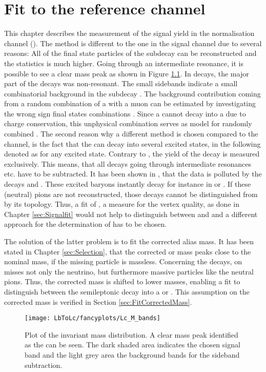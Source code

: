 \chapter{Fit to the reference channel \LbToLcmunu}
\label{sec:Normalisationfit}
This chapter describes the measurement of the signal yield \NLc in the normalisation channel \LbToLcmunu (\LcTopKpi). 
The method is different to the one in the signal channel \LbToDpmunuX due to several reasons:
All of the final state particles of the subdecay \LcTopKpi can be reconstructed and the statistics is much higher. 
Going through an intermediate resonance, it is possible to see a clear \Lc mass peak as shown in Figure \ref{fig:plot_Lc_M_bands}.
In \LbToDpmunuX decays, the major part of the decays was non-resonant.
The small sidebands indicate a small combinatorial background in the subdecay \LcTopKpi.
The background contribution coming from a random combination of a \Lc with a muon can be estimated by investigating the wrong sign final states combinations \Lc\mup.
Since a \Lb cannot decay into a \Lc\mup due to charge conservation, this unphysical combination serves as model for randomly combined \Lc\mun.
The second reason why a different method is chosen compared to the \LbToDpmunuX channel, is the fact that the \Lb can decay into several excited \Lc states, in the following denoted as \Lcstar for any excited \Lc state.
Contrary to \LbToDpmunuX, the yield of the decay \LbToLcmunu is measured exclusively.
This means, that all decays going through intermediate resonances etc. have to be subtracted.
It has been shown in \cite{SL_Vub}, that the \LbToLcmunu data is polluted by the decays  and .
These excited \Lcstar baryons instantly decay for instance in \Lc\pip\pim or \Lc\piz. 
If these (neutral) pions are not reconstructed, those decays cannot be distinguished from \LbToLcmunu by its topology.
Thus, a fit of \logIP, a measure for the vertex quality, as done in Chapter \ref{sec:Signalfit} would not help to distinguish between \LbToLcmunu and \decay{\Lb}{\Lcstar\mun\neumb} and a different approach for the determination of \NLc has to be chosen.

The solution of the latter problem is to fit the corrected \pKpi\mun alias \Lb mass.
It has been stated in Chapter \ref{sec:Selection}, that the corrected \pKpi\mun or \Lb mass peaks close to the nominal \Lb mass, if the missing particle is massless.
Concerning the \decay{\Lb}{\Lcstar\mun\neumb} decays, on misses not only the neutrino, but furthermore massive particles like the neutral pions.
Thus, the corrected \Lb mass is shifted to lower masses, enabling a fit to distinguish between the semileptonic \Lb decay into a \Lc or \Lcstar.
This assumption on the corrected mass is verified in Section \ref{sec:FitCorrectedMass}.
\begin{figure}[tbp]
    \centering
	\texttt{[image: LbToLc/fancyplots/Lc\_M\_bands]}	
	\caption{Plot of the invariant \pKpi mass distribution. A clear mass peak identified as the \Lc can be seen. The dark shaded area indicates the chosen signal band and the light grey area the background bands for the sideband subtraction.}
	\label{fig:plot_Lc_M_bands}
\end{figure}

